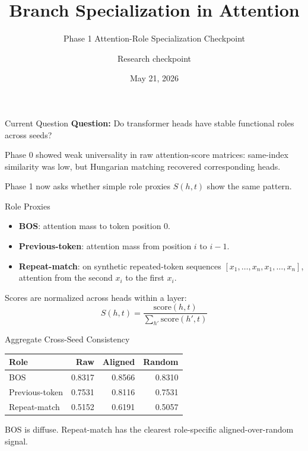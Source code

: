 \documentclass[aspectratio=169]{beamer}
\title{Branch Specialization in Attention}
\subtitle{Phase 1 Attention-Role Specialization Checkpoint}
\author{Research checkpoint}
\date{May 21, 2026}
\begin{document}
\begin{frame}
  \titlepage
\end{frame}

\begin{frame}{Current Question}
  \textbf{Question:} Do transformer heads have stable functional roles across seeds?

  \vspace{0.7em}
  Phase 0 showed weak universality in raw attention-score matrices:
  same-index similarity was low, but Hungarian matching recovered corresponding
  heads.

  \vspace{0.7em}
  Phase 1 now asks whether simple role proxies \(S(h,t)\) show the same pattern.
\end{frame}

\begin{frame}{Role Proxies}
  \begin{itemize}
    \item \textbf{BOS}: attention mass to token position 0.
    \item \textbf{Previous-token}: attention mass from position \(i\) to \(i-1\).
    \item \textbf{Repeat-match}: on synthetic repeated-token sequences
      \([x_1,\ldots,x_n,x_1,\ldots,x_n]\), attention from the second \(x_i\) to
      the first \(x_i\).
  \end{itemize}

  \vspace{0.6em}
  Scores are normalized across heads within a layer:
  \[
    S(h,t) = \frac{\mathrm{score}(h,t)}{\sum_{h'} \mathrm{score}(h',t)}
  \]
\end{frame}

\begin{frame}{Aggregate Cross-Seed Consistency}
  \begin{table}
    \centering
    \begin{tabular}{lrrr}
      \toprule
      Role & Raw & Aligned & Random \\
      \midrule
      BOS & 0.8317 & 0.8566 & 0.8310 \\
      Previous-token & 0.7531 & 0.8116 & 0.7531 \\
      Repeat-match & 0.5152 & 0.6191 & 0.5057 \\
      \bottomrule
    \end{tabular}
  \end{table}

  BOS is diffuse. Repeat-match has the clearest role-specific aligned-over-random signal.
\end{frame}
\end{document}
